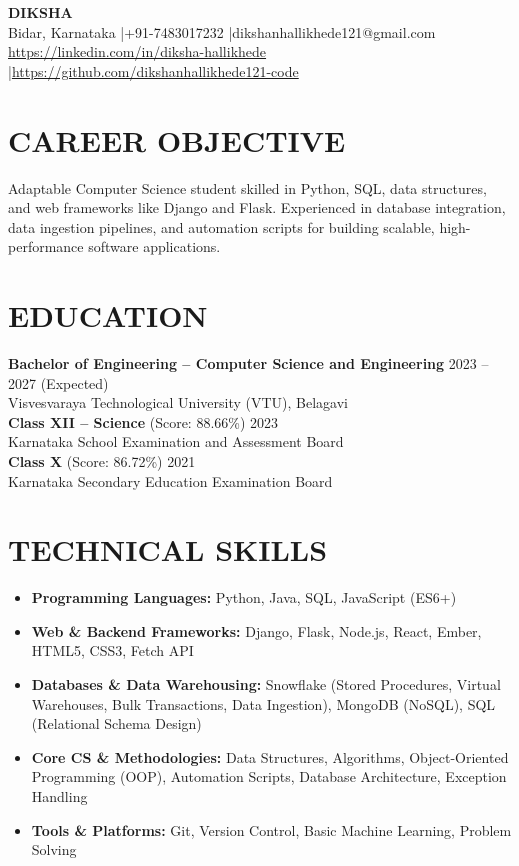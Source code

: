 \documentclass{article}
\begin{document}
\begin{center}
    {\Huge \textbf{DIKSHA}} \\[0.5em]
    Bidar, Karnataka \quad|\quad +91-7483017232 \quad|\quad dikshanhallikhede121@gmail.com \\
    \url{https://linkedin.com/in/diksha-hallikhede} \quad|\quad \url{https://github.com/dikshanhallikhede121-code}
\end{center}

\vspace{0.5em}

\section*{CAREER OBJECTIVE}
Adaptable Computer Science student skilled in Python, SQL, data structures, and web frameworks like Django and Flask. Experienced in database integration, data ingestion pipelines, and automation scripts for building scalable, high-performance software applications.

\section*{EDUCATION}
\textbf{Bachelor of Engineering – Computer Science and Engineering} \hfill 2023 -- 2027 (Expected) \\
Visvesvaraya Technological University (VTU), Belagavi \\[0.3em]
\textbf{Class XII – Science} (Score: 88.66\%) \hfill 2023 \\
Karnataka School Examination and Assessment Board \\[0.3em]
\textbf{Class X} (Score: 86.72\%) \hfill 2021 \\
Karnataka Secondary Education Examination Board

\section*{TECHNICAL SKILLS}
\begin{itemize}[leftmargin=*, itemsep=0.2em]
    \item \textbf{Programming Languages:} Python, Java, SQL, JavaScript (ES6+)
    \item \textbf{Web \& Backend Frameworks:} Django, Flask, Node.js, React, Ember, HTML5, CSS3, Fetch API
    \item \textbf{Databases \& Data Warehousing:} Snowflake (Stored Procedures, Virtual Warehouses, Bulk Transactions, Data Ingestion), MongoDB (NoSQL), SQL (Relational Schema Design)
    \item \textbf{Core CS \& Methodologies:} Data Structures, Algorithms, Object-Oriented Programming (OOP), Automation Scripts, Database Architecture, Exception Handling
    \item \textbf{Tools \& Platforms:} Git, Version Control, Basic Machine Learning, Problem Solving
\end{itemize}
\end{document}
